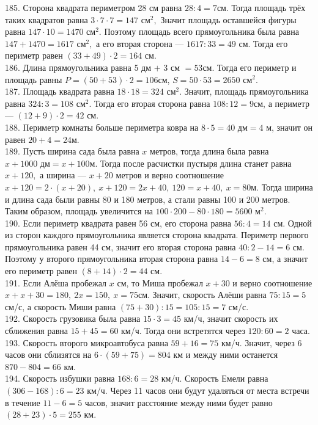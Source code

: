 185. Сторона квадрата периметром 28 см равна $28:4=7$см. Тогда площадь трёх таких квадратов равна $3\cdot7\cdot7=147\text{ см}^2,$ Значит площадь оставшейся фигуры равна $147\cdot10=1470\text{ см}^2.$ Поэтому площадь всего прямоугольника была равна $147+1470=1617\text{ см}^2,$ а его вторая сторона --- $1617:33=49$ см. Тогда его периметр равен $(33+49)\cdot2=164$ см.\\
186. Длина прямоугольника равна 5 дм $+$ 3 см $=53$см. Тогда его периметр и площадь равны $P=(50+53)\cdot2=106$см, $S=50\cdot53=2650\text{ см}^2.$\\
187. Площадь квадрата равна $18\cdot18=324\text{ см}^2.$ Значит, площадь прямоугольника равна $324:3=108\text{ см}^2.$ Тогда его вторая сторона равна $108:12=9$см, а периметр --- $(12+9)\cdot2=42$ см.\\
188. Периметр комнаты больше периметра ковра на $8\cdot5=40\text{ дм}=4$ м, значит он равен $20+4=24$м.\\
189. Пусть ширина сада была равна $x$ метров, тогда длина была равна $x+1000\text{ дм}=x+100$м. Тогда после расчистки пустыря длина станет равна $x+120,$ а ширина --- $x+20$ метров и верно соотношение $x+120=2\cdot(x+20),\ x+120=2x+40,\ 120=x+40,\ x=80$м. Тогда ширина и длина сада были равны 80 и 180 метров, а стали равны 100 и 200 метров. Таким образом, площадь увеличится на $100\cdot200-80\cdot180=5600\text{ м}^2.$\\
190. Если периметр квадрата равен 56 см, его сторона равна $56:4=14$ см. Одной из сторон каждого прямоугольника является сторона квадрата. Периметр первого прямоугольника равен 44 см, значит его вторая сторона равна $40:2-14=6$ см. Поэтому у второго прямоугольника вторая сторона равна $14-6=8$ см, а значит его периметр равен $(8+14)\cdot2=44$ см.\\
191. Если Алёша пробежал $x$ см, то Миша пробежал $x+30$ и верно соотношение $x+x+30=180,\ 2x=150,\ x=75$см. Значит, скорость Алёши равна $75:15=5$ см/с, а скорость Миши равна $(75+30):15=105:15=7$ см/с.\\
192. Скорость грузовика была равна $15\cdot3=45$ км/ч, значит скорость их сближения равна $15+45=60$ км/ч. Тогда они встретятся через $120:60=2$ часа.\\
193. Скорость второго микроавтобуса равна $59+16=75$ км/ч. Значит, через 6 часов они сблизятся на $6\cdot(59+75)=804$ км и между ними останется $870-804=66$ км.\\
194. Скорость избушки равна $168:6=28$ км/ч. Скорость Емели равна $(306-168):6=23$ км/ч. Через 11 часов они будут удаляться от места встречи в течение $11-6=5$ часов, значит расстояние между ними будет равно $(28+23)\cdot5=255$ км.\\

